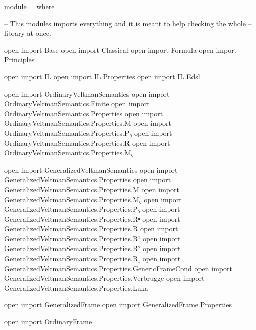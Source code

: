 \begin{spverbatim}
module _ where

-- This modules imports everything and it is meant to help checking the whole
-- library at once.

open import Base
open import Classical
open import Formula
open import Principles

open import IL
open import IL.Properties
open import IL.Edsl

open import OrdinaryVeltmanSemantics
open import OrdinaryVeltmanSemantics.Finite
open import OrdinaryVeltmanSemantics.Properties
open import OrdinaryVeltmanSemantics.Properties.M
open import OrdinaryVeltmanSemantics.Properties.P₀
open import OrdinaryVeltmanSemantics.Properties.R
open import OrdinaryVeltmanSemantics.Properties.M₀

open import GeneralizedVeltmanSemantics
open import GeneralizedVeltmanSemantics.Properties
open import GeneralizedVeltmanSemantics.Properties.M
open import GeneralizedVeltmanSemantics.Properties.M₀
open import GeneralizedVeltmanSemantics.Properties.P₀
open import GeneralizedVeltmanSemantics.Properties.Rⁿ
open import GeneralizedVeltmanSemantics.Properties.R
open import GeneralizedVeltmanSemantics.Properties.R¹
open import GeneralizedVeltmanSemantics.Properties.R²
open import GeneralizedVeltmanSemantics.Properties.R₁
open import GeneralizedVeltmanSemantics.Properties.GenericFrameCond
open import GeneralizedVeltmanSemantics.Properties.Verbrugge
open import GeneralizedVeltmanSemantics.Properties.Luka

open import GeneralizedFrame
open import GeneralizedFrame.Properties

open import OrdinaryFrame
\end{spverbatim}
